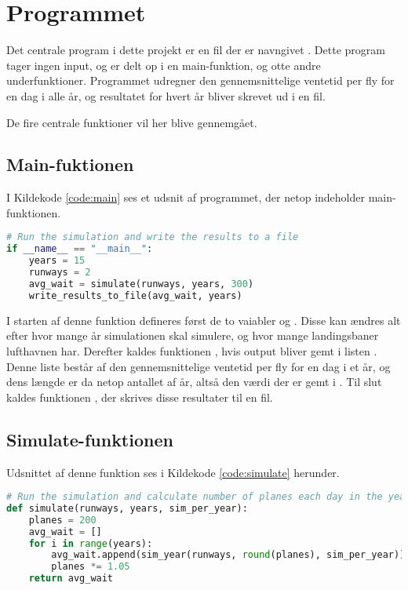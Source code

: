 \chapter{Programmet} \label{chap:program}
Det centrale program i dette projekt er en fil der er navngivet .
Dette program tager ingen input, og er delt op i en main-funktion, og otte andre underfunktioner.
Programmet udregner den gennemsnittelige ventetid per fly for en dag i alle år, og resultatet for hvert år bliver skrevet ud i en fil.

De fire centrale funktioner vil her blive gennemgået.

\section{Main-fuktionen}
I Kildekode \ref{code:main} ses et udsnit af programmet, der netop indeholder main-funktionen.

\begin{lstlisting}[language=Python, caption={Main-funktionen i airplanes.py}, label=code:main]
# Run the simulation and write the results to a file
if __name__ == "__main__":
    years = 15
    runways = 2
    avg_wait = simulate(runways, years, 300)
    write_results_to_file(avg_wait, years)
\end{lstlisting}

I starten af denne funktion defineres først de to vaiabler  og . Disse kan ændres alt efter hvor mange år simulationen skal simulere, og hvor mange landingsbaner lufthavnen har.
Derefter kaldes funktionen , hvis output bliver gemt i listen .
Denne liste består af den gennemsnittelige ventetid per fly for en dag i et år, og dens længde er da netop antallet af år, altså den værdi der er gemt i .
Til slut kaldes funktionen , der skrives disse resultater til en fil.

\section{Simulate-funktionen}
Udsnittet af denne funktion ses i Kildekode \ref{code:simulate} herunder.

\begin{lstlisting}[language=Python, caption={simulate-funktionen i airplanes.py}, label=code:simulate]
# Run the simulation and calculate number of planes each day in the year
def simulate(runways, years, sim_per_year):
    planes = 200
    avg_wait = []
    for i in range(years):
        avg_wait.append(sim_year(runways, round(planes), sim_per_year))
        planes *= 1.05
    return avg_wait
\end{lstlisting}

